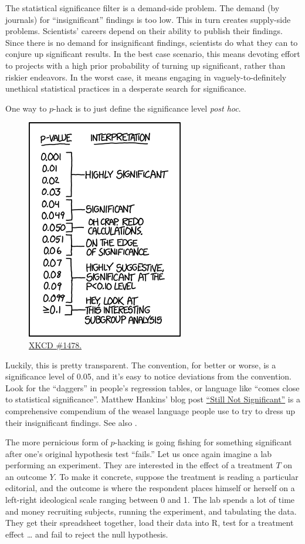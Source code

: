 \documentclass[12pt,oneside,openany]{book}
\begin{document}
The statistical significance filter is a demand-side problem. The demand
(by journals) for ``insignificant'' findings is too low. This in turn
creates supply-side problems. Scientists' careers depend on their
ability to publish their findings. Since there is no demand for
insignificant findings, scientists do what they can to conjure up
significant results. In the best case scenario, this means devoting
effort to projects with a high prior probability of turning up
significant, rather than riskier endeavors. In the worst case, it means
engaging in vaguely-to-definitely unethical statistical practices in a
desperate search for significance.

One way to \(p\)-hack is to just define the significance level
\emph{post hoc}.

\begin{figure}
\centering
\includegraphics{p_values.png}
\caption{\href{https://xkcd.com/1478/}{XKCD \#1478.}}
\end{figure}

Luckily, this is pretty transparent. The convention, for better or
worse, is a significance level of 0.05, and it's easy to notice
deviations from the convention. Look for the ``daggers'' in people's
regression tables, or language like ``comes close to statistical
significance''. Matthew Hankins' blog post
\href{https://mchankins.wordpress.com/2013/04/21/still-not-significant-2/}{``Still
Not Significant''} is a comprehensive compendium of the weasel language
people use to try to dress up their insignificant findings. See also
\citet{pritschet2016marginally}.

The more pernicious form of \(p\)-hacking is going fishing for something
significant after one's original hypothesis test ``fails.'' Let us once
again imagine a lab performing an experiment. They are interested in the
effect of a treatment \(T\) on an outcome \(Y\). To make it concrete,
suppose the treatment is reading a particular editorial, and the outcome
is where the respondent places himself or herself on a left-right
ideological scale ranging between 0 and 1. The lab spends a lot of time
and money recruiting subjects, running the experiment, and tabulating
the data. They get their spreadsheet together, load their data into R,
test for a treatment effect \ldots{} and fail to reject the null
hypothesis.
\end{document}
